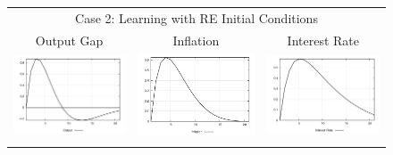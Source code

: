 \begin{figure}
\begin{tabular}{ccc}
\multicolumn{3}{c}{Case 2: Learning with RE Initial Conditions}\\
Output Gap & Inflation & Interest Rate \\ 
\includegraphics[scale=0.28]{results_reallinit/Output_natshock_irf.png} & 
\includegraphics[scale=0.28]{results_reallinit/Inflation_natshock_irf.png} & 
\includegraphics[scale=0.28]{results_reallinit/Interest_Rate_natshock_irf.png} \\ \\ 

\end{tabular}
\end{figure}
